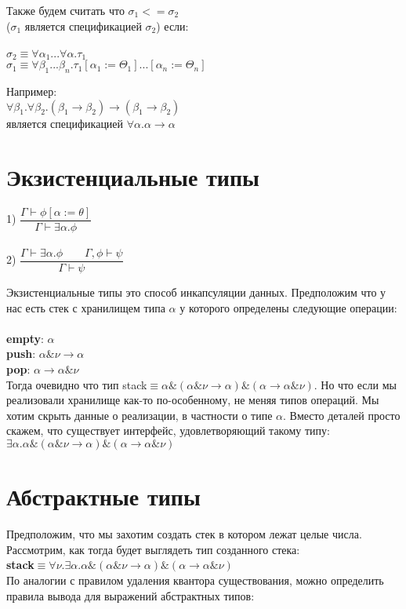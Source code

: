 	 Также будем считать что $ \sigma_1 <= \sigma_2 $\\
	 ($\sigma_1$ является спецификацией $\sigma_2$) если: \\\\
	 $\sigma_2\equiv\forall\alpha_1...\forall\alpha.\tau_1$\\
	 $\sigma_1\equiv\forall\beta_1...\beta_n.\tau_1[\alpha_1:=\Theta_1]...[\alpha_n:=\Theta_n]  $
	 
	 \noindent Например:\\
	 $ \forall\beta_1.\forall\beta_2.(\beta_1\rightarrow\beta_2)\rightarrow(\beta_1\rightarrow\beta_2) $\\
	 является спецификацией $ \forall\alpha.\alpha\rightarrow\alpha $\\
	 \section{Экзистенциальные типы}
	 1) $\dfrac{\Gamma\vdash\phi[\alpha:=\theta]}{\Gamma\vdash\exists\alpha.\phi}$\\ \\
	 2) $\dfrac{\Gamma\vdash\exists\alpha.\phi\qquad\Gamma,\phi\vdash\psi}{\Gamma\vdash\psi}$
	 
	  Экзистенциальные типы это способ инкапсуляции данных. Предположим что у нас есть стек с хранилищем типа $\alpha$ у которого определены следующие операции:\\\\
	 \textbf{empty}: $\alpha$\\
	 \textbf{push}: $\alpha\&\nu\rightarrow\alpha$\\
	 \textbf{pop}: $\alpha\rightarrow\alpha\&\nu$\\
	 
	 Тогда очевидно что тип stack$\equiv\alpha\&(\alpha\&\nu\rightarrow\alpha)\&(\alpha\rightarrow\alpha\&\nu)$.
	 Но что если мы реализовали хранилище как-то по-особенному, не меняя типов операций. Мы хотим скрыть данные о реализации, в частности о типе $\alpha$. Вместо деталей просто скажем, что существует интерфейс, удовлетворяющий такому типу:\\$\exists\alpha.\alpha\&(\alpha\&\nu\rightarrow\alpha)\&(\alpha\rightarrow\alpha\&\nu)$
	 
	 \section{Абстрактные типы}	 
	 Предположим, что мы захотим создать стек в котором лежат целые числа. Рассмотрим, как тогда будет выглядеть тип созданного стека: \\
	 \textbf{stack}$\equiv\forall\nu.\exists\alpha.\alpha\&(\alpha\&\nu\rightarrow\alpha)\&(\alpha\rightarrow\alpha\&\nu)$\\
 	По аналогии с правилом удаления квантора существования, можно определить правила вывода для выражений абстрактных типов: \\

